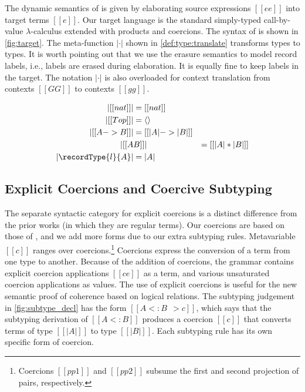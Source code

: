 The dynamic semantics of \namee is given by elaborating source expressions
$[[ee]]$ into target terms $[[e]]$. Our target language \tname is the standard
simply-typed call-by-value $\lambda$-calculus extended with products and
coercions. The syntax of \tname is shown in \cref{fig:target}. The meta-function
$| \cdot |$ shown in \cref{def:type:translate} transforms \namee types to \tname
types. It is worth pointing out that we use the erasure semantics to model
record labels, i.e., labels are erased during elaboration. It is equally fine to
keep labels in the target. The notation $| \cdot |$ is also overloaded for
context translation from \namee contexts $[[GG]]$ to \tname contexts $[[gg]]$.

\begin{definition} \label{def:type:translate}
  \begin{align*}
    | [[nat]] | &= [[nat]] \\
    | [[Top]] | &= \langle \rangle \\
    | [[A -> B]]  | &= [[ | A | -> | B |  ]] \\
    | [[ A & B  ]] | &= [[ | A | * | B |  ]] \\
    | \recordType{l}{A} | &= | A |
  \end{align*}
\end{definition}



\subsection{Explicit Coercions and Coercive Subtyping}

The separate syntactic category for explicit coercions is a distinct
difference from the prior works (in which they are regular terms). Our coercions
are based on those of \citet{Henglein_1994}, and we add more forms due to our
extra subtyping rules.
Metavariable $[[c]]$ ranges over coercions.\footnote{Coercions $[[pp1]]$ and $[[pp2]]$ subsume the first and second projection of pairs, respectively.}
Coercions express the conversion
of a term from one type to another. Because of the addition of coercions, the
grammar contains explicit coercion applications $[[c e]]$ as a term, and various
unsaturated coercion applications as values. The use of explicit coercions is useful for the new semantic
proof of coherence based on logical relations.
The subtyping judgement in \cref{fig:subtype_decl} has the form $[[A <: B ~~> c]]$, which says that the
subtyping derivation of $[[A <: B]]$ produces a coercion $[[c]]$ that converts
terms of type $[[ |A| ]]$ to type $[[ |B| ]]$. Each subtyping rule has its own
specific form of coercion.


